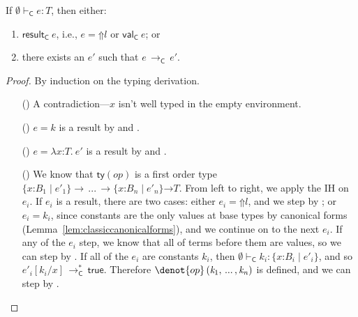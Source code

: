\documentclass[9pt]{extarticle}
\newcommand{\ottnt}[1]{\mathit{#1}}
\newcommand{\ottmv}[1]{\mathit{#1}}
\newcommand{\ottsym}[1]{#1}
\begin{document}
\begin{lemma}
  \label{lem:classicprogress}
  If $ \emptyset   \vdash _{  \mathsf{C}  }  \ottnt{e}  :  \ottnt{T} $, then either:
  \begin{enumerate}
  \item $ \mathsf{result} _{  \mathsf{C}  }~ \ottnt{e} $, i.e., $\ottnt{e}  \ottsym{=}   \mathord{\Uparrow}  \ottnt{l} $ or $ \mathsf{val} _{  \mathsf{C}  }~ \ottnt{e} $; or
  \item there exists an $\ottnt{e'}$ such that $\ottnt{e} \,  \longrightarrow _{  \mathsf{C}  }  \, \ottnt{e'}$.
  \end{enumerate}
\begin{proof}
    By induction on the typing derivation.
{\iffull
    \begin{itemize}
    \item[(\T{Var})] A contradiction---$\mathit{x}$ isn't well typed in the
      empty environment.

    \item[(\T{Const})] $\ottnt{e}  \ottsym{=}  \ottnt{k}$ is a result by  and .

    \item[(\T{Abs})] $\ottnt{e}  \ottsym{=}   \lambda \mathit{x} \mathord{:} \ottnt{T} .~  \ottnt{e'} $ is a result by  and .

    \item[(\T{Op})] We know that $ \mathsf{ty} (\mathord{ \ottnt{op} }) $ is a first order type
      $ {}   \{ \mathit{x} \mathord{:} \ottnt{B_{{\mathrm{1}}}} \mathrel{\mid} \ottnt{e'_{{\mathrm{1}}}} \}   \rightarrow \, ... \, \rightarrow   \{ \mathit{x} \mathord{:} \ottnt{B_{\ottmv{n}}} \mathrel{\mid} \ottnt{e'_{\ottmv{n}}} \}   {} \mathord{ \rightarrow } \ottnt{T} $.
From left to right, we apply the IH on $\ottnt{e_{\ottmv{i}}}$. If $\ottnt{e_{\ottmv{i}}}$ is
      a result, there are two cases: either $\ottnt{e_{\ottmv{i}}}  \ottsym{=}   \mathord{\Uparrow}  \ottnt{l} $, and
      we step by ; or $\ottnt{e_{\ottmv{i}}}  \ottsym{=}  \ottnt{k_{\ottmv{i}}}$, since constants are
      the only values at base types by canonical forms
      (Lemma~\ref{lem:classiccanonicalforms}), and we continue on to the next
      $\ottnt{e_{\ottmv{i}}}$. If any of the $\ottnt{e_{\ottmv{i}}}$ step, we know that all of terms
      before them are values, so we can step by . If all of
      the $\ottnt{e_{\ottmv{i}}}$ are constants $\ottnt{k_{\ottmv{i}}}$, then $ \emptyset   \vdash _{  \mathsf{C}  }  \ottnt{k_{\ottmv{i}}}  :   \{ \mathit{x} \mathord{:} \ottnt{B_{\ottmv{i}}} \mathrel{\mid} \ottnt{e'_{\ottmv{i}}} \}  $, and so $ \ottnt{e'_{\ottmv{i}}}  [  \ottnt{k_{\ottmv{i}}} / \mathit{x}  ]  \,  \longrightarrow ^{*}_{  \mathsf{C}  }  \,  \mathsf{true} $. Therefore
      $\denot{ op } \, \ottsym{(}  \ottnt{k_{{\mathrm{1}}}}  \ottsym{,} \, ... \, \ottsym{,}  \ottnt{k_{\ottmv{n}}}  \ottsym{)}$ is defined, and we can step by .


\end{itemize}}
\end{proof}
\end{lemma}
\end{document}

